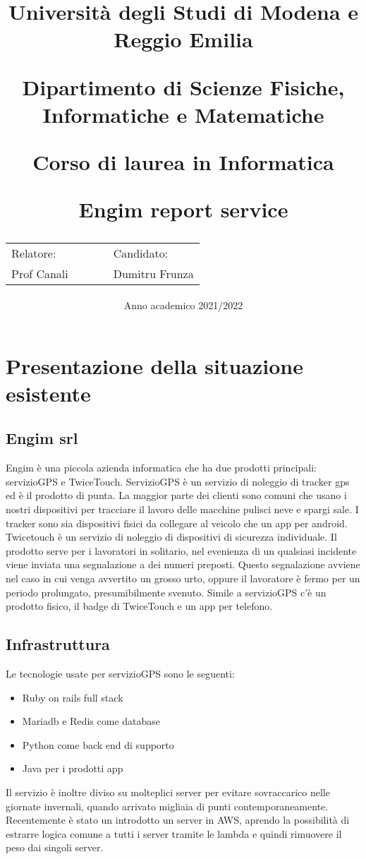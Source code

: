 \documentclass[12pt]{article}
\author{}
\title{
    \huge 
        \textbf{Università degli Studi di Modena e Reggio Emilia}
    \large
        \par Dipartimento di Scienze Fisiche, Informatiche e Matematiche
        \par Corso di laurea in Informatica
    \vfil
        \huge \par \textbf{Engim report service}
    \vfil
    \normalsize
    \begin{tabular}{lllll}
      Relatore: &&&& Candidato: \\
      Prof Canali &&&&  Dumitru Frunza \\
      \end{tabular}
}
\date{Anno academico 2021/2022}
\begin{document}
\maketitle
\section{Presentazione della situazione esistente}
\subsection{Engim srl}
Engim è una piccola azienda informatica che ha due prodotti principali: servizioGPS e TwiceTouch.
ServizioGPS è un servizio di noleggio di tracker gps ed è il prodotto di punta.
La maggior parte dei clienti sono comuni che usano i nostri dispositivi per tracciare il
lavoro delle macchine pulisci neve e spargi sale.
I tracker sono sia dispositivi fisici da collegare al veicolo che un app per
android.
\newline Twicetouch è un servizio di noleggio di dispositivi di sicurezza individuale.
Il prodotto serve per i lavoratori in solitario, nel evenienza di un qualsiasi
incidente viene inviata una segnalazione a dei numeri preposti. Questo segnalazione
avviene nel caso in cui venga avvertito un grosso urto, oppure il lavoratore è
fermo per un periodo prolungato, presumibilmente svenuto. Simile a servizioGPS c'è
un prodotto fisico, il badge di TwiceTouch e un app per telefono.

\subsection{Infrastruttura}
Le tecnologie usate per servizioGPS sono le seguenti:
\begin{itemize}
  \item Ruby on rails full stack
  \item Mariadb e Redis come database
  \item Python come back end di supporto
  \item Java per i prodotti app
\end{itemize}
Il servizio è inoltre diviso su molteplici server per evitare sovraccarico nelle
giornate invernali, quando arrivato migliaia di punti contemporaneamente.
Recentemente è stato un introdotto un server in AWS, aprendo la possibilità di
estrarre logica comune a tutti i server tramite le lambda e quindi rimuovere il
peso dai singoli server.
\end{document}
